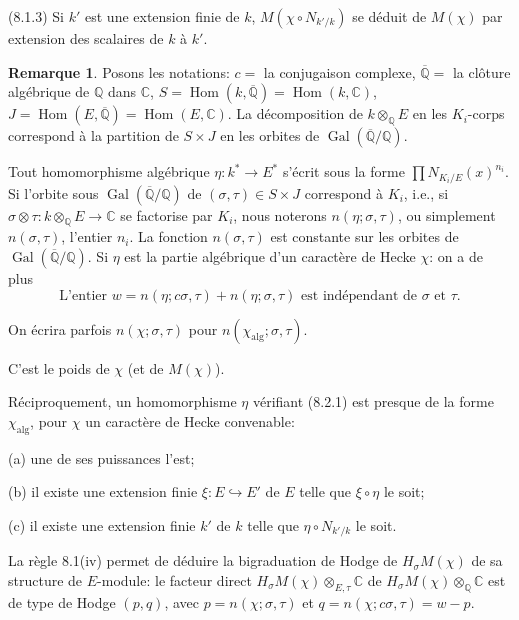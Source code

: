 \documentclass[12pt,a4paper]{article}
\theoremstyle{plain}
\theoremstyle{definition}
\newtheorem{remark}[definition]{Remarque}
\theoremstyle{remark}
\DeclareMathOperator{\Hom}{Hom}
\DeclareMathOperator{\Gal}{Gal}
\newcommand{\Q}{\mathbb{Q}}
\newcommand{\C}{\mathbb{C}}
\begin{document}
(8.1.3) Si $k'$ est une extension finie de $k$, $M(\chi \circ N_{k'/k})$ se d\'eduit de $M(\chi)$
par extension des scalaires de $k$ \`a $k'$.

\begin{remark}
Posons les notations: $c =$ la conjugaison complexe, $\overline{\Q} =$ la cl\^oture alg\'ebrique de
$\Q$ dans $\C$, $S = \Hom(k, \overline{\Q}) = \Hom(k, \C)$, $J = \Hom(E, \overline{\Q}) = \Hom(E, \C)$. La
d\'ecomposition de $k \otimes_\Q E$ en les $K_i$-corps correspond \`a la partition de
$S \times J$ en les orbites de $\Gal(\overline{\Q}/\Q)$.

Tout homomorphisme alg\'ebrique $\eta: k^* \to E^*$ s'\'ecrit sous la forme
$\prod N_{K_i/E}(x)^{n_i}$. Si l'orbite sous $\Gal(\overline{\Q}/\Q)$ de $(\sigma, \tau) \in S \times J$
correspond \`a $K_i$, i.e., si $\sigma \otimes \tau: k \otimes_\Q E \to \C$ se factorise par $K_i$,
nous noterons $n(\eta; \sigma, \tau)$, ou simplement $n(\sigma, \tau)$, l'entier $n_i$. La fonction
$n(\sigma, \tau)$ est constante sur les orbites de $\Gal(\overline{\Q}/\Q)$. Si $\eta$ est la partie
alg\'ebrique d'un caract\`ere de Hecke $\chi$: on a de plus
\begin{equation}\label{eq:8.2.1}
\text{L'entier } w = n(\eta; c\sigma, \tau) + n(\eta; \sigma, \tau) \text{ est ind\'ependant de } \sigma \text{ et } \tau.
\end{equation}

On \'ecrira parfois $n(\chi; \sigma, \tau)$ pour $n(\chi_{\text{alg}}; \sigma, \tau)$.

C'est le poids de $\chi$ (et de $M(\chi)$).

R\'eciproquement, un homomorphisme $\eta$ v\'erifiant (8.2.1) est presque de la forme
$\chi_{\text{alg}}$, pour $\chi$ un caract\`ere de Hecke convenable:

(a) une de ses puissances l'est;

(b) il existe une extension finie $\xi: E \hookrightarrow E'$ de $E$ telle que $\xi \circ \eta$ le soit;

(c) il existe une extension finie $k'$ de $k$ telle que $\eta \circ N_{k'/k}$ le soit.

La r\`egle 8.1(iv) permet de d\'eduire la bigraduation de Hodge de $H_\sigma M(\chi)$ de sa
structure de $E$-module: le facteur direct $H_\sigma M(\chi) \otimes_{E,\tau} \C$ de
$H_\sigma M(\chi) \otimes_\Q \C$ est de type de Hodge $(p,q)$, avec
$p = n(\chi; \sigma, \tau)$ et $q = n(\chi; c\sigma, \tau) = w - p$.
\end{remark}
\end{document}
